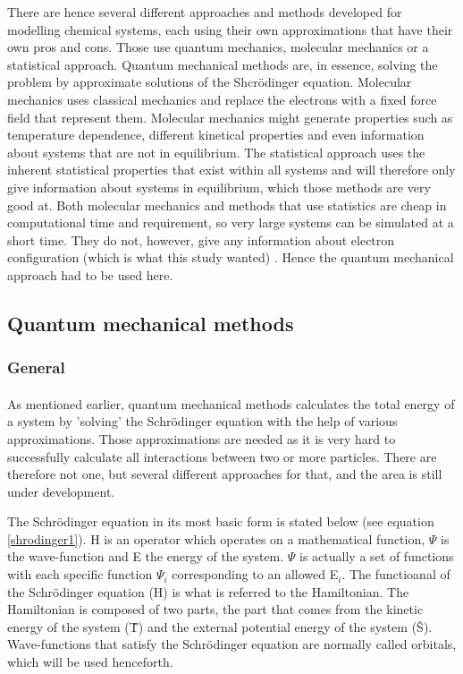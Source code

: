 \documentclass[10pt,a4paper]{article}
\begin{document}
There are hence several different approaches and methods developed for modelling chemical systems, each using their own approximations that have their own pros and cons. Those use quantum mechanics, molecular mechanics  or a statistical approach. Quantum mechanical methods are, in essence, solving the problem by approximate solutions of the Shcrödinger equation.  Molecular mechanics uses classical mechanics and replace the electrons with a fixed force field that represent  them. Molecular mechanics might generate properties such as temperature dependence, different kinetical properties and even information about systems that are not in equilibrium.  The statistical approach uses the inherent statistical properties that exist within all systems and will therefore only give information about systems in equilibrium, which those methods are very good at. Both molecular mechanics and methods that use statistics are cheap in computational time and requirement, so very large systems can be simulated at a short time. They do not, however, give any information about electron configuration (which is what this study wanted) \cite{computionalprimer}. Hence the quantum mechanical approach had to be used here.

\subsection{Quantum mechanical methods}
\subsubsection{General}
\paragraph*{}
As mentioned earlier, quantum mechanical methods calculates the total energy of a system by 'solving' the Schrödinger equation with the help of various approximations. Those approximations are needed as it is very hard to successfully calculate all interactions between two or more particles. There are therefore not one, but several different approaches for that, and the area is still under development. 

The Schrödinger equation in its most basic form is stated below (see equation \ref{shrodinger1}). H is an operator which operates on a  mathematical function, $\Psi$ is the wave-function and E the energy of the system. $\Psi$ is actually a set of functions with each specific function $\Psi_i$ corresponding to an allowed E$_i$. The functioanal  of the Schrödinger equation (H) is what is referred to the Hamiltonian. 
The Hamiltonian is composed of two parts, the part that comes from the kinetic energy of the system (\^{T}) and the external potential energy of the system (\^{S}). Wave-functions that satisfy the Schrödinger equation are normally called orbitals, which will be used  henceforth. 
\end{document}
